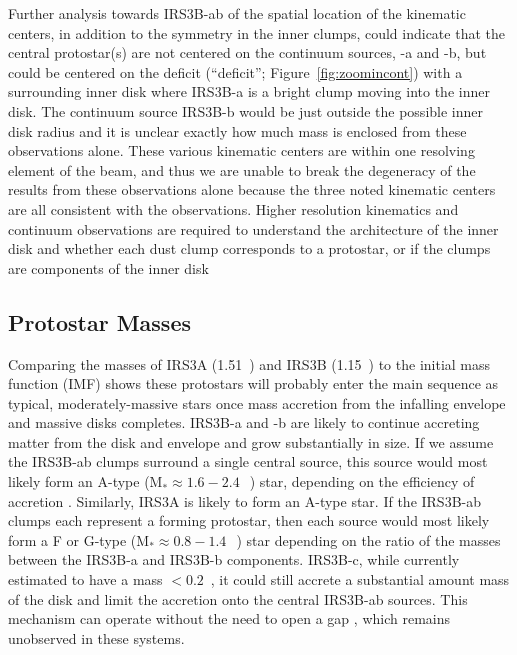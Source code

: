 \documentclass[twocolumn, 12pt, trackchanges]{aastex63}
\begin{document}
Further analysis towards IRS3B-ab of the spatial location of the kinematic centers, in addition to the symmetry in the inner clumps, could indicate that the central protostar(s) are not centered on the continuum sources, -a and -b, but could be centered on the deficit (``deficit''; Figure~\ref{fig:zoomincont}) with a surrounding inner disk where IRS3B-a is a bright clump moving into the inner disk. The continuum source IRS3B-b would be just outside the possible inner disk radius and it is unclear exactly how much mass is enclosed from these observations alone. These various kinematic centers are within one resolving element of the \cso\space beam, and thus we are unable to break the degeneracy of the results from these observations alone because the three noted kinematic centers are all consistent with the \cso\space observations. Higher resolution kinematics and continuum observations are required to understand the architecture of the inner disk and whether each dust clump corresponds to a protostar, or if the clumps are components of the inner disk 

\subsection{Protostar Masses}
Comparing the masses of IRS3A (1.51~\solm) and IRS3B (1.15~\solm) to the initial mass function (IMF) \citep[young cluster IMF towards binaries;][]{2005ASSL..327...41C} shows these protostars will probably enter the main sequence as typical, moderately-massive stars once mass accretion from the infalling envelope and massive disks completes. IRS3B-a and -b are likely to continue accreting matter from the disk and envelope and grow substantially in size. If we assume the IRS3B-ab clumps surround a single central source, this source would most likely form an A-type (M$_{*}\approx1.6-2.4~$~\solm) star, depending on the efficiency of accretion \citep[10-15\%;][]{2007ApJ...656..293J}. Similarly, IRS3A is likely to form an A-type star. If the IRS3B-ab clumps each represent a forming protostar, then each source would most likely form a F or G-type (M$_{*}\approx0.8-1.4~$~\solm) star depending on the ratio of the masses between the IRS3B-a and IRS3B-b components. IRS3B-c, while currently estimated to have a mass $<0.2$~\solm, it could still accrete a substantial amount mass of the disk and limit the accretion onto the central IRS3B-ab sources. This mechanism can operate without the need to open a gap \citep[][]{1996LNP...465..115A}, which remains unobserved in these systems.
\end{document}
